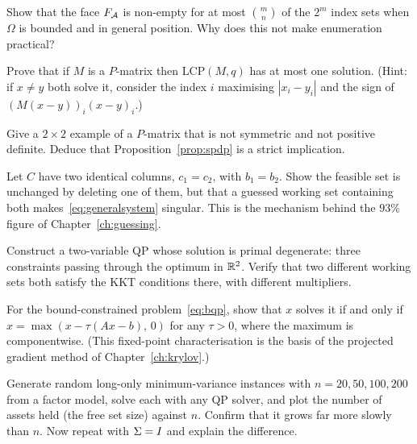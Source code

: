 \begin{exercises}

\begin{exercise}
Show that the face $F_{\mathcal{A}}$ is non-empty for at most $\binom{m}{n}$ of the
$2^m$ index sets when $\Omega$ is bounded and in general position. Why does this
not make enumeration practical?
\end{exercise}

\begin{exercise}
Prove that if $M$ is a $P$-matrix then $\mathrm{LCP}(M,q)$ has at most one
solution. (Hint: if $x \ne y$ both solve it, consider the index $i$ maximising
$|x_i - y_i|$ and the sign of $(M(x-y))_i(x-y)_i$.)
\end{exercise}

\begin{exercise}
Give a $2 \times 2$ example of a $P$-matrix that is not symmetric and not positive
definite. Deduce that Proposition~\ref{prop:spdp} is a strict implication.
\end{exercise}

\begin{exercise}
Let $C$ have two identical columns, $c_1 = c_2$, with $b_1 = b_2$. Show the
feasible set is unchanged by deleting one of them, but that a guessed working set
containing both makes~\eqref{eq:generalsystem} singular. This is the mechanism
behind the $93\%$ figure of Chapter~\ref{ch:guessing}.
\end{exercise}

\begin{exercise}
Construct a two-variable QP whose solution is primal degenerate: three constraints
passing through the optimum in $\mathbb{R}^2$. Verify that two different working sets both
satisfy the KKT conditions there, with different multipliers.
\end{exercise}

\begin{exercise}
For the bound-constrained problem~\eqref{eq:bqp}, show that $x$ solves it if and
only if $x = \max(x - \tau(Ax - b),\,0)$ for any $\tau > 0$, where the maximum is
componentwise. (This fixed-point characterisation is the basis of the projected
gradient method of Chapter~\ref{ch:krylov}.)
\end{exercise}

\begin{exercise}[Implementation]
Generate random long-only minimum-variance instances with $n = 20, 50, 100, 200$
from a factor model, solve each with any QP solver, and plot the number of assets
held (the free set size) against $n$. Confirm that it grows far more slowly than
$n$. Now repeat with $\Sigma = I$ and explain the difference.
\end{exercise}

\end{exercises}
